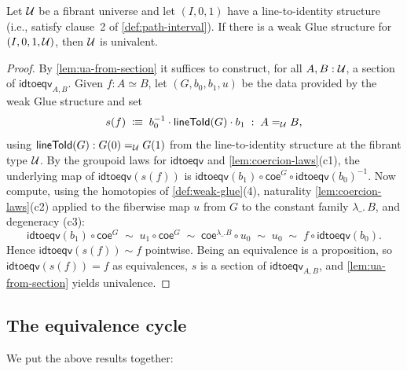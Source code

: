 \begin{theorem}\label{thm:weak-glue-implies-ua}
	Let $\mathcal{U}$ be a fibrant universe and let $(I,0,1)$ have a line-to-identity structure (i.e., satisfy clause~2 of
	\cref{def:path-interval}). If there is a weak Glue structure for
	$(I,0,1,\mathcal{U})$, then $\mathcal{U}$ is univalent.
\end{theorem}
\begin{proof}
	By \cref{lem:ua-from-section} it suffices to construct, for all $A,B:\mathcal{U}$, a
	section of $\mathsf{idtoeqv}_{A,B}$. Given $f:A\simeq B$, let
	$(G,b_0,b_1,u)$ be the data provided by the weak Glue structure and set
	\[
		s(f)\;\mathrel{\vcentcolon\mspace{-1mu}\equiv}\;b_0^{-1}\cdot\mathsf{lineToId}(G)\cdot b_1
		\;:\;A=_{\mathcal{U}} B ,
	\]
	using $\mathsf{lineToId}(G):G(0)=_{\mathcal{U}} G(1)$ from the line-to-identity structure at the
	fibrant type $\mathcal{U}$. By the groupoid laws for $\mathsf{idtoeqv}$ and
	\cref{lem:coercion-laws}(c1), the underlying map of $\mathsf{idtoeqv}(s(f))$
	is $\mathsf{idtoeqv}(b_1)\circ\mathsf{coe}^G\circ\mathsf{idtoeqv}(b_0)^{-1}$.
	Now compute, using the homotopies of \cref{def:weak-glue}(4), naturality
	\cref{lem:coercion-laws}(c2) applied to the fiberwise map $u$ from $G$ to
	the constant family $\lambda\_.\,B$, and degeneracy (c3):
	\[
		\mathsf{idtoeqv}(b_1)\circ\mathsf{coe}^G
		\;\sim\;u_1\circ\mathsf{coe}^G
		\;\sim\;\mathsf{coe}^{\lambda\_.B}\circ u_0
		\;\sim\;u_0
		\;\sim\;f\circ\mathsf{idtoeqv}(b_0).
	\]
	Hence $\mathsf{idtoeqv}(s(f))\sim f$ pointwise. Being an equivalence is a
	proposition, so $\mathsf{idtoeqv}(s(f))=f$ as equivalences, $s$ is a section of
	$\mathsf{idtoeqv}_{A,B}$, and \cref{lem:ua-from-section} yields univalence.
\end{proof}

\subsection{The equivalence cycle}

We put the above results together:

